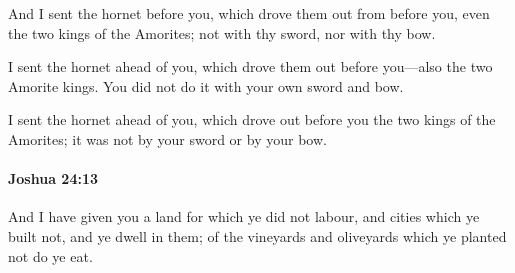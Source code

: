 			\begin{versebox}
					\item[BHS] 
					\item[ASV] And I sent the hornet before you, which drove them out from before you, even the two kings of the Amorites; not with thy sword, nor with thy bow.
					\item[NIV] I sent the hornet ahead of you, which drove them out before you—also the two Amorite kings. You did not do it with your own sword and bow.
					\item[NRSV] I sent the hornet ahead of you, which drove out before you the two kings of the Amorites; it was not by your sword or by your bow.
			\end{versebox}

		\paragraph{Joshua 24:13} %
			\label{JOSHUA-24-13}

			And I have given you a land for which ye did not labour, and cities which ye built not, and ye dwell in them; of the vineyards and oliveyards which ye planted not do ye eat.

